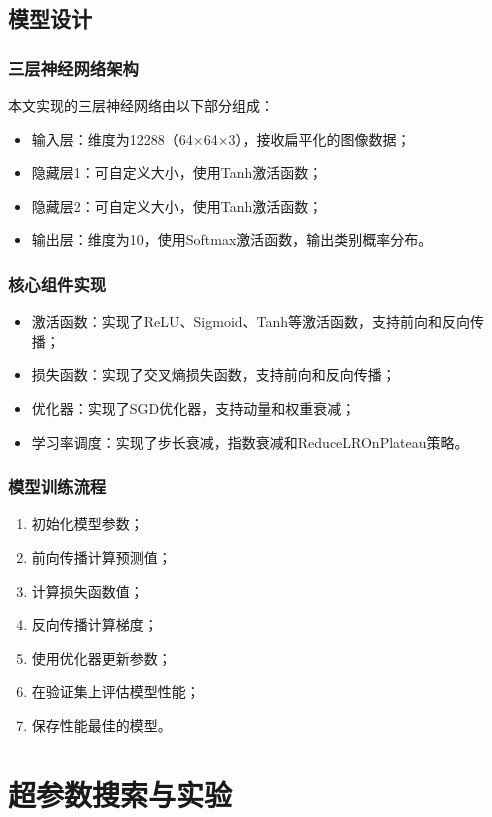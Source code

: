 \documentclass[UTF8]{article}
\begin{document}
\subsection{模型设计}
\subsubsection{三层神经网络架构}
本文实现的三层神经网络由以下部分组成：
\begin{itemize}[topsep=0pt, partopsep=0pt, itemsep=0pt, parsep=0pt]
    \item 输入层：维度为12288（64×64×3），接收扁平化的图像数据；
    \item 隐藏层1：可自定义大小，使用Tanh激活函数；
    \item 隐藏层2：可自定义大小，使用Tanh激活函数；
    \item 输出层：维度为10，使用Softmax激活函数，输出类别概率分布。
\end{itemize}
\subsubsection{核心组件实现}
\begin{itemize}[topsep=0pt, partopsep=0pt, itemsep=0pt, parsep=0pt]
    \item 激活函数：实现了ReLU、Sigmoid、Tanh等激活函数，支持前向和反向传播；
    \item 损失函数：实现了交叉熵损失函数，支持前向和反向传播；
    \item 优化器：实现了SGD优化器，支持动量和权重衰减；
    \item 学习率调度：实现了步长衰减，指数衰减和ReduceLROnPlateau策略。
\end{itemize}
\subsubsection{模型训练流程}
\begin{enumerate}[topsep=0pt, partopsep=0pt, itemsep=0pt, parsep=0pt]
    \item 初始化模型参数；
    \item 前向传播计算预测值；
    \item 计算损失函数值；
    \item 反向传播计算梯度；
    \item 使用优化器更新参数；
    \item 在验证集上评估模型性能；
    \item 保存性能最佳的模型。
\end{enumerate}
\section{超参数搜索与实验}
\end{document}
